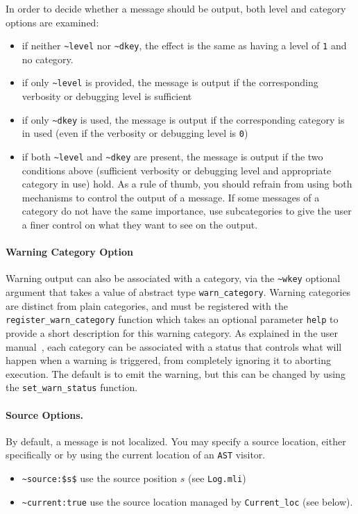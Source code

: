 In order to decide whether a message should be output, both level and category
options are examined:
\begin{itemize}
\item if neither \lstinline|~level| nor \lstinline|~dkey|, the effect is the
  same as having a level of \lstinline|1| and no category.
\item if only \lstinline|~level| is provided, the message is output if the
  corresponding verbosity or debugging level is sufficient
\item if only \lstinline|~dkey| is used, the message is output if the
  corresponding category is in used
  (even if the verbosity or debugging level is \lstinline|0|)
\item if both \lstinline|~level| and \lstinline|~dkey| are present,
  the message is output if the two conditions above
  (sufficient verbosity or debugging level and appropriate category in use)
  hold. As a rule of thumb, you should refrain from using both mechanisms to
  control the output of a message. If some messages of a category do not have
  the same importance, use subcategories to give the user a finer control on
  what they want to see on the output.
\end{itemize}

\paragraph{Warning Category Option} Warning output can also be associated with a
category, via the \lstinline|~wkey| optional argument that takes a value of
abstract type 
\lstinline|warn_category|. Warning categories are distinct from plain
categories, and must be registered with the
\lstinline|register_warn_category| function which takes an optional parameter
\lstinline|help| to provide a short description for this warning category. As
explained in the user manual~\cite{userman}, each category can be associated
with a status that controls what will happen when a warning is triggered, from
completely ignoring it to aborting execution. The default is to emit the
warning, but this can be changed by using the
\lstinline|set_warn_status| function.

\paragraph{Source Options.} By default, a message is not localized. You may
specify a source location, either specifically or by using the current
location of an \texttt{AST} visitor.
\lstset{style=frama-c-style,language=}
\begin{itemize}
\item[] \lstinline{~source:$s$} use the source position $s$ (see \texttt{Log.mli})
\item[] \lstinline{~current:true} use the source location
  managed by \texttt{Current\_loc} (see below).
\end{itemize}

